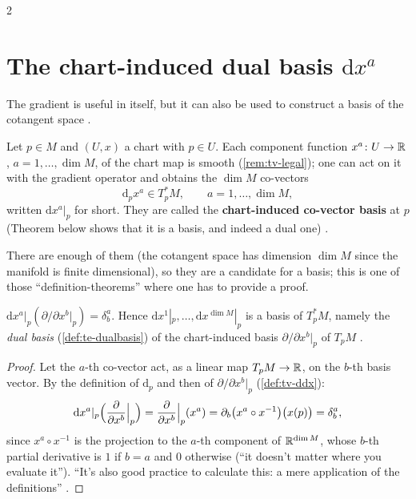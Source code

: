 \begin{paracol}{2}
\section{The chart-induced dual basis $\mathrm dx^a$}\label{sec:tb-dx}

The gradient is useful in itself, but it can also be used to construct a basis of the cotangent space  .
\begin{definition}\label{def:tb-dx}
Let $p\in M$ and $(U,x)$ a chart with $p\in U$. Each component function $x^a\colon U\to\mathbb{R}$, $a=1,\dots,\dim M$, of the chart map is smooth (\cref{rem:tv-legal}); one can act on it with the gradient operator and obtains the $\dim M$ co-vectors
\[
  \mathrm d_px^a\in T^*_pM,\qquad a=1,\dots,\dim M,
\]
written $\mathrm dx^a|_p$ for short. They are called the \textbf{chart-induced co-vector basis} at $p$ (Theorem below shows that it is a basis, and indeed a dual one)      .
\end{definition}
There are enough of them (the cotangent space has dimension $\dim M$ since the manifold is finite dimensional), so they are a candidate for a basis; this is one of those ``definition-theorems'' where one has to provide a proof.
\begin{theorem}\label{thm:tb-dualbasis}
$\mathrm dx^a|_p(\partial/\partial x^b|_p)=\delta^a_b$. Hence $\mathrm dx^1|_p,\dots,\mathrm dx^{\dim M}|_p$ is a basis of $T^*_pM$, namely the \emph{dual basis} (\cref{def:te-dualbasis}) of the chart-induced basis $\partial/\partial x^b|_p$ of $T_pM$    .
\end{theorem}
\begin{proof}
Let the $a$-th co-vector act, as a linear map $T_pM\to\mathbb{R}$, on the $b$-th basis vector. By the definition of $\mathrm d_p$ and then of $\partial/\partial x^b|_p$ (\cref{def:tv-ddx}):
\[
  \mathrm dx^a|_p\Bigl(\frac{\partial}{\partial x^b}\Bigr|_p\Bigr)=\frac{\partial}{\partial x^b}\Bigr|_p(x^a)=\partial_b\bigl(x^a\circ x^{-1}\bigr)\bigl(x(p)\bigr)=\delta^a_b,
\]
since $x^a\circ x^{-1}$ is the projection to the $a$-th component of $\mathbb{R}^{\dim M}$, whose $b$-th partial derivative is $1$ if $b=a$ and $0$ otherwise (``it doesn't matter where you evaluate it''). ``It's also good practice to calculate this: a mere application of the definitions''      .

\end{proof}
\end{paracol}
